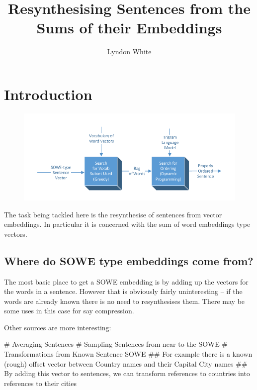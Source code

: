 \documentclass[]{scrartcl}
\title{Resynthesising Sentences from the Sums of their Embeddings}
\author{Lyndon White}
\begin{document}
\maketitle

\begin{abstract}

\end{abstract}

\section{Introduction}


\begin{figure}
	\centering 
	\includegraphics{block_diagram}
\end{figure}
The task being tackled here is the resynthesise of sentences from vector embeddings.
In particular it is concerned with the sum of word embeddings type vectors.

\subsection{Where do SOWE type embeddings come from?}
The most basic place to get a SOWE embedding is by adding up the vectors for the words in a sentence.
However that is obviously fairly uninteresting -- if the words are already known there is no need to resynthesises them. There may be some uses in this case for say compression.

Other sources are more interesting:

\begin{easylist}[itemize]
	# Averaging Sentences
	# Sampling Sentences from near to the SOWE
	# Transformations from Known Sentence SOWE
	## For example there is a known (rough) offset vector between Country names and their Capital City names
	## By adding this vector to sentences, we can transform references to countries into references to their cities
\end{easylist}
\end{document}
